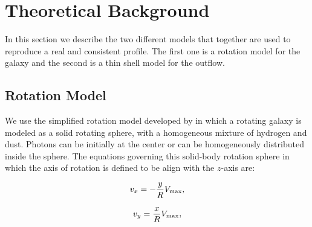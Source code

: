 \documentclass{latex/emulateapj}
\begin{document}



\section{Theoretical Background}
\label{sec:theo}
In this section we describe the two different models that together are
used to reproduce a real and consistent \lya profile. The first one is
a rotation model for the galaxy and the second is a thin shell model
for the outflow. \\ 

\subsection{Rotation Model}

We use the simplified rotation model developed by \citep{Garavito14}
in which a rotating galaxy is modeled as a solid rotating sphere, with
a homogeneous mixture of hydrogen and dust. Photons can be initially
at the center or can be homogeneously distributed inside the
sphere. The equations governing this solid-body rotation sphere in
which the axis of rotation is defined to be align with the $z$-axis
are: 

\begin{equation}
v_{x}=-\frac{y}{R}V_{\rm max}, \label{subeq1}
\end{equation}

\begin{equation}
v_{y}=\frac{x}{R}V_{\rm max}, \label{subeq2}
\end{equation}
\end{document}
